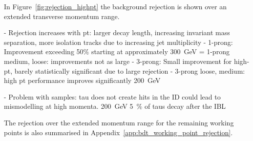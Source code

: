 In Figure~\ref{fig:rejection_highpt} the background rejection is shown over an
extended transverse momentum range.

- Rejection increases with pt: larger decay length, increasing invariant mass separation, more isolation tracks due to increasing jet multiplicity
- 1-prong: Improvement exceeding 50\% starting at approximately \SI{300}{\GeV}
= 1-prong medium, loose: improvements not as large
- 3-prong: Small improvement for high-pt, barely statistically significant due to large rejection
- 3-prong loose, medium: high pt performance improves significantly \SI{200}{\GeV}

- Problem with samples: tau does not create hits in the ID could lead to mismodelling at high momenta. \SI{200}{\GeV} \SI{5}{\percent} of taus decay after the IBL

The rejection over the extended momentum range for the remaining working points
is also summarised in Appendix~\ref{app:bdt_working_point_rejection}.

